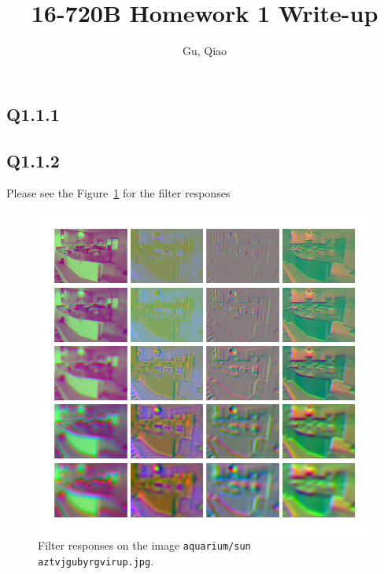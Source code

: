 \documentclass[11pt]{article}
\newcommand{\code}[1]{\texttt{#1}}
\begin{document}
\author{Gu, Qiao}
\title{16-720B Homework 1 Write-up}
\maketitle

\medskip

\subsection*{Q1.1.1}

\newpage

\subsection*{Q1.1.2}

Please see the Figure~\ref{fig:q1.1.2} for the filter responses

\begin{figure}[h!]
    \centering
    \includegraphics[width=\linewidth]{../results/q1_1_2_responses.png}
    \caption{Filter responses on the image \code{aquarium/sun aztvjgubyrgvirup.jpg}. }
    \label{fig:q1.1.2}
\end{figure}

\newpage
\end{document}
